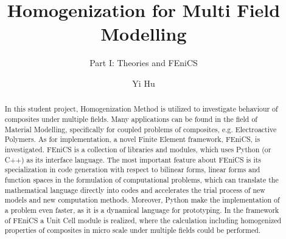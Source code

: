 \documentclass[10pt,a4paper]{scrartcl}
\author{Yi Hu}
\title{Homogenization for Multi Field Modelling}
\subtitle{Part I: Theories and FEniCS}
\begin{document}
\begin{abstract}
In this student project, Homogenization Method is utilized to investigate behaviour of composites under multiple fields. Many applications can be found in the field of Material Modelling, specifically for coupled problems of composites, e.g. Electroactive Polymers. As for implementation, a novel Finite Element framework, FEniCS, is investigated. FEniCS is a collection of libraries and modules, which uses Python (or C++) as its interface language. The most important feature about FEniCS is its specialization in code generation with respect to bilinear forms, linear forms and function spaces in the formulation of computational problems, which can translate the mathematical language directly into codes and accelerates the trial process of new models and new computation methods. Moreover, Python make the implementation of a problem even faster, as it is a dynamical language for prototyping. In the framework of FEniCS a Unit Cell module is realized, where the calculation including homogenized properties of composites in micro scale under multiple fields could be performed.

\end{abstract}
\end{document}
